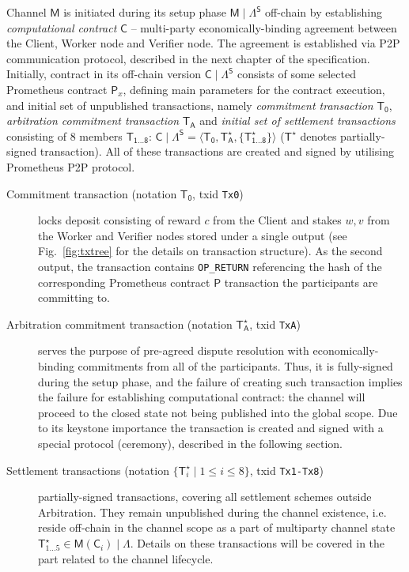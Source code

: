 \documentclass[a4paper]{article}
\begin{document}
Channel $\mathsf{M}$ is initiated during its setup phase $\mathsf{M}\mid\Lambda^\mathsf{S}$ off-chain by establishing \textit{computational contract} $\mathsf{C}$ -- multi-party economically-binding agreement between the Client, Worker node and Verifier node. The agreement is established via P2P communication protocol, described in the next chapter of the specification. 
Initially, contract in its off-chain version $\mathsf{C}\mid\Lambda^\mathsf{S}$ consists of some selected Prometheus contract $\mathsf{P}_x$, defining main parameters for the contract execution, and initial set of unpublished transactions, namely \textit{commitment transaction} $\mathsf{T_0}$, \textit{arbitration commitment transaction} $\mathsf{T_A}$ and \textit{initial set of settlement transactions} consisting of 8 members $\mathsf{T_{1\dots 8}}$: $\mathsf{C}\mid\Lambda^\mathsf{S} = \langle \mathsf{T_0}, \mathsf{T^\star_A}, \{ \mathsf{T^\star_{1\dots 8}} \} \rangle$ ($\mathsf{T}^\star$ denotes partially-signed transaction). All of these transactions are created and signed by utilising Prometheus P2P protocol.

\begin{description}
    \item[Commitment transaction (notation $\mathsf{T_0}$, txid \texttt{Tx0})] 
    locks deposit consisting of reward $c$ from the Client and stakes $w, v$ from the Worker and Verifier nodes stored under a single output (see Fig.~\ref{fig:txtree} for the details on transaction structure). As the second output, the transaction contains \texttt{OP\_RETURN}  referencing the hash of the corresponding Prometheus contract $\mathsf{P}$ transaction the participants are committing to. 
    
    \item[Arbitration commitment transaction (notation $\mathsf{T^\star_A}$, txid \texttt{TxA})] 
    serves the purpose of pre-agreed dispute resolution with economically-binding commitments from all of the participants. Thus, it is fully-signed during the setup phase, and the failure of creating such transaction implies the failure for establishing computational contract: the channel will proceed to the closed state not being published into the global scope. Due to its keystone importance the transaction is created and signed with a special protocol (ceremony), described in the following section.

    \item[Settlement transactions (notation $\{ \mathsf{T}^\star_i \mid 1 \le i \le 8 \}$, txid \texttt{Tx1-Tx8})] 
    partially-signed transactions, covering all settlement schemes outside Arbitration. They remain unpublished during the channel existence, i.e. reside off-chain in the channel scope as a part of multiparty channel state $\mathsf{T}^\star_{1\dots5} \in \mathsf{M}(\mathsf{C}_i) \mid \Lambda$. Details on these transactions will be covered in the part related to the channel lifecycle.

\end{description}
\end{document}
